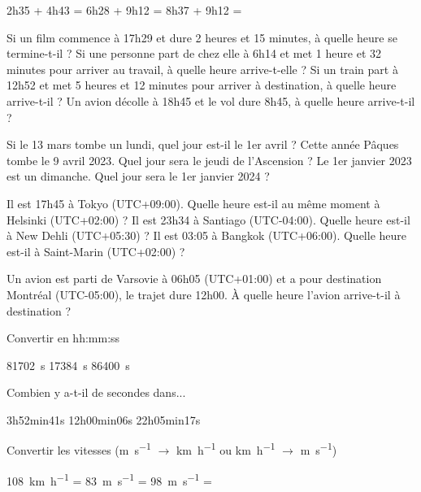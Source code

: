 \documentclass[../Cours.tex]{subfiles}
\begin{document}
\clearpage
\EXERCICES 
\begin{questions}
    \exercice
    \begin{multicols}{3}
        \questionX 2h35 + 4h43 = 
        \questionX 6h28 + 9h12 = 
        \questionX 8h37 + 9h12 = 
    \end{multicols}

    
    \exercice
    \question Si un film commence à 17h29 et dure 2 heures et 15 minutes, à quelle heure se termine-t-il ?
    \question Si une personne part de chez elle à 6h14 et met 1 heure et 32 minutes pour arriver au travail, à quelle heure arrive-t-elle ?
    \question Si un train part à 12h52 et met 5 heures et 12 minutes pour arriver à destination, à quelle heure arrive-t-il ?
    \question Un avion décolle à 18h45 et le vol dure 8h45, à quelle heure arrive-t-il ?
    

    \exercice
    \question Si le 13 mars tombe un lundi, quel jour est-il le 1er avril ?
    \question Cette année Pâques tombe le 9 avril 2023. Quel jour sera le jeudi de l'Ascension ?
    \question Le 1er janvier 2023 est un dimanche. Quel jour sera le 1er janvier 2024 ?

    \exercice 
    \question Il est 17h45 à Tokyo (UTC+09:00). Quelle heure est-il au même moment à Helsinki (UTC+02:00) ?
    \question Il est 23h34 à Santiago (UTC-04:00). Quelle heure est-il à New Dehli (UTC+05:30) ?
    \question Il est 03:05 à Bangkok (UTC+06:00). Quelle heure est-il à Saint-Marin (UTC+02:00) ?

    \exercice Un avion est parti de Varsovie à 06h05 (UTC+01:00) et a pour destination Montréal (UTC-05:00), le trajet dure 12h00. À quelle heure l'avion arrive-t-il à destination ?

    \exercice Convertir en hh:mm:ss
    \begin{multicols}{3}
        \questionX \qty{81702}{\second}
        \questionX \qty{17384}{\second}
        \questionX \qty{86400}{\second}
    \end{multicols}

    \exercice Combien y a-t-il de secondes dans...
    \begin{multicols}{3}
        \questionX 3h52min41s
        \questionX 12h00min06s
        \questionX 22h05min17s
    \end{multicols}

    \exercice Convertir les vitesses (\unit{\metre\per\second} $\longrightarrow$ \unit{\kilo\metre\per\hour} ou \unit{\kilo\metre\per\hour} $\longrightarrow$ \unit{\metre\per\second})
    \begin{multicols}{3}
        \questionX \qty{108}{\kilo\metre\per\hour} =
        \questionX \qty{83}{\metre\per\second} = 
        \questionX \qty{98}{\metre\per\second} = 
    \end{multicols}


\end{questions}
\end{document}
